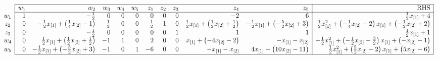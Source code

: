\documentclass[11pt]{article}
\begin{document}
\begin{landscape}
$\begin{array}{c|rrrrrrrrrr|r|}
\cline{2-12}
 & w_1 & w_2 & w_3 & w_4 & w_5 & z_1 & z_2 & z_3 & z_4 & z_5 & \text{RHS}\\
\cline{2-12}
w_1 & 1&-\frac{1}{2}&0&0&0&0&0&0&-2&6&\frac{1}{2}\*x_{[1]}
 + 4\\
z_2 & 0&-\frac{1}{2}\*x_{[1]}
 + \left(\frac{1}{4}\*x_{[2]}
 - 1\right) &\frac{1}{2}&0&0&\frac{1}{2}&1&0&\frac{1}{2}\*x_{[1]}
 + \left(\frac{1}{2}\*x_{[2]}
 + \frac{1}{2}\right) &-\frac{1}{2}\*x_{[1]}
 + \left(-\frac{5}{2}\*x_{[2]}
 + 3\right) &\frac{1}{2}\*x_{[1]}^2
 + \left(-\frac{1}{4}\*x_{[2]}
 + 2\right) \*x_{[1]}
 + \left(-\frac{1}{2}\*x_{[2]}
 + 2\right) \\
z_3 & 0&-\frac{1}{2}&0&0&0&0&0&1&1&1&\frac{1}{2}\*x_{[1]}
 + 1\\
w_4 & 0&\frac{1}{2}\*x_{[1]}
 + \left(\frac{1}{2}\*x_{[2]}
 + \frac{1}{2}\right) &-1&1&0&2&0&0&x_{[1]}
 + \left(-4\*x_{[2]}
 - 2\right) &-x_{[1]}
 - x_{[2]}&-\frac{1}{2}\*x_{[1]}^2
 + \left(-\frac{1}{2}\*x_{[2]}
 - \frac{3}{2}\right) \*x_{[1]}
 + \left(-x_{[2]}
 - 1\right) \\
w_5 & 0&-\frac{1}{2}\*x_{[1]}
 + \left(-\frac{5}{2}\*x_{[2]}
 + 3\right) &-1&0&1&-6&0&0&-x_{[1]}
 - x_{[2]}&4\*x_{[1]}
 + \left(10\*x_{[2]}
 - 11\right) &\frac{1}{2}\*x_{[1]}^2
 + \left(\frac{5}{2}\*x_{[2]}
 - 2\right) \*x_{[1]}
 + \left(5\*x_{[2]}
 - 6\right) \\
\cline{2-12}
\end{array}$~\\~\\


\end{landscape}
\end{document}

